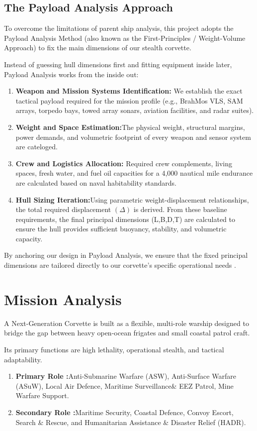\documentclass[12pt,a4paper,twoside]{report}
\begin{document}
   \subsection{The Payload Analysis Approach}
   To overcome the limitations of parent ship analysis, this project adopts the Payload Analysis Method (also known as the First-Principles / Weight-Volume Approach) to fix the main dimensions of our stealth corvette. \vspace{\baselineskip} \par\noindent Instead of guessing hull dimensions first and fitting equipment inside later, Payload Analysis works from the inside out:
   \begin{enumerate}[\alph*)]
       \item\textbf{Weapon and Mission Systems Identification: } We establish the exact tactical payload required for the mission profile (e.g., BrahMos VLS, SAM arrays, torpedo bays, towed array sonars, aviation facilities, and radar suites).
       \item \textbf{Weight and Space Estimation:}The physical weight, structural margins, power demands, and volumetric footprint of every weapon and sensor system are cateloged.
       \item \textbf{Crew and Logistics Allocation: } Required crew complements, living spaces, fresh water, and fuel oil capacities for a 4,000 nautical mile endurance are calculated based on naval habitability standards.
       \item \textbf{Hull Sizing Iteration:}Using parametric weight-displacement relationships, the total required displacement $(\Delta)$ is derived. From these baseline requirements, the final principal dimensions (L,B,D,T) are calculated to ensure the hull provides sufficient buoyancy, stability, and volumetric capacity.
   \end{enumerate}
   By anchoring our design in Payload Analysis, we ensure that the fixed principal dimensions are tailored directly to our corvette’s specific operational needs .
   \section{Mission Analysis}
   A Next-Generation Corvette is built as a flexible, multi-role warship designed to bridge the gap between heavy open-ocean frigates and small coastal patrol craft.
   \vspace{\baselineskip} \par\noindent Its primary functions are high lethality, operational stealth, and tactical adaptability.
   \begin{enumerate}[\alph*)]
       \item \textbf{Primary Role :}Anti-Submarine Warfare (ASW), Anti-Surface Warfare (ASuW), Local Air Defence, Maritime Surveillance\& EEZ Patrol, Mine Warfare Support.
       \item \textbf{Secondary Role :}Maritime Security, Coastal Defence, Convoy Escort, Search \& Rescue, and Humanitarian Assistance \& Disaster Relief (HADR).
   \end{enumerate}
\end{document}
